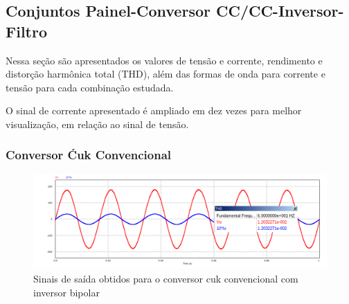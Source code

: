 \documentclass[
	12pt,				%
	openany,
	onseside,
	a4paper,			%
	english,			%
	french,				%
	spanish,			%
	brazil,				%
	]{abntex2}
\begin{document}
\subsection{Conjuntos Painel-Conversor CC/CC-Inversor-Filtro}

Nessa seção são apresentados os valores de tensão e corrente, rendimento e distorção harmônica total (THD), além das formas de onda para corrente e tensão para cada combinação estudada.

O sinal de corrente apresentado é ampliado em dez vezes para melhor visualização, em relação ao sinal de tensão.

\subsubsection{Conversor Ćuk Convencional}

\begin{figure}[H]%
	\captionsetup{justification=centering}
	\centering
		\includegraphics[width= \linewidth]{conv_Vo_10Io_comp}
		\caption{Sinais de saída obtidos para o conversor cuk convencional com inversor bipolar}
		\label{fig:out_conv_bip}
\end{figure}

\begin{table}[H]
	\captionsetup{justification=centering}
	\centering
	\caption{Valores obtidos para o conversor cuk convencional com inversor bipolar}
	\label{tab:conv_bip_res}
\end{table}
\end{document}
